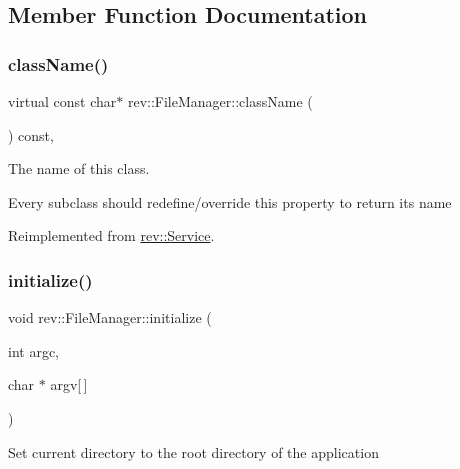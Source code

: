 \subsection{Member Function Documentation}
\mbox{\label{classrev_1_1_file_manager_abfb467bdcfbacd82f041139a15d73fa0}} 
\subsubsection{\texorpdfstring{className()}{className()}}
{\footnotesize\ttfamily virtual const char$\ast$ rev\+::\+File\+Manager\+::class\+Name (\begin{DoxyParamCaption}{ }\end{DoxyParamCaption}) const\hspace{0.3cm}{\ttfamily [inline]}, {\ttfamily [virtual]}}



The name of this class. 

Every subclass should redefine/override this property to return its name 

Reimplemented from \mbox{\hyperlink{classrev_1_1_service_a484d71757ea6e8780488602cb421a4a5}{rev\+::\+Service}}.

\mbox{\label{classrev_1_1_file_manager_a71446f681e447ad0193860643fabf15c}} 
\subsubsection{\texorpdfstring{initialize()}{initialize()}}
{\footnotesize\ttfamily void rev\+::\+File\+Manager\+::initialize (\begin{DoxyParamCaption}\item[{int}]{argc,  }\item[{char $\ast$}]{argv\mbox{[}$\,$\mbox{]} }\end{DoxyParamCaption})\hspace{0.3cm}{\ttfamily [protected]}}

Set current directory to the root directory of the application \mbox{\label{classrev_1_1_file_manager_a57e18b80b80bde22fb0917daae4662bc}} 
